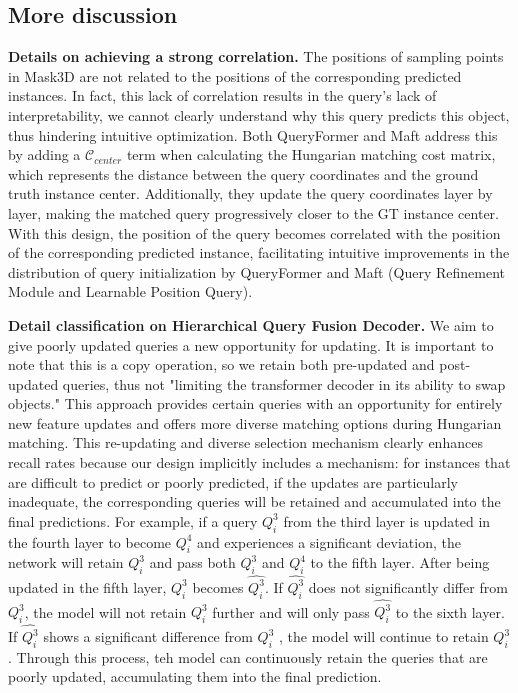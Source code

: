 \subsection{More discussion}
\label{Morediscussion}
\textbf{Details on achieving a strong correlation.} The positions of sampling points in Mask3D are not related to the positions of the corresponding predicted instances. In fact, this lack of correlation results in the query's lack of interpretability, we cannot clearly understand why this query predicts this object, thus hindering intuitive optimization. Both QueryFormer and Maft address this by adding a  $\mathcal{C}_{center}$
term when calculating the Hungarian matching cost matrix, which represents the distance between the query coordinates and the ground truth instance center. Additionally, they update the query coordinates layer by layer, making the matched query progressively closer to the GT instance center. With this design, the position of the query becomes correlated with the position of the corresponding predicted instance, facilitating intuitive improvements in the distribution of query initialization by QueryFormer and Maft (Query Refinement Module and Learnable Position Query).

\textbf{Detail classification on Hierarchical Query Fusion Decoder.} We aim to give poorly updated queries a new opportunity for updating. It is important to note that this is a copy operation, so we retain both pre-updated and post-updated queries, thus not "limiting the transformer decoder in its ability to swap objects." This approach provides certain queries with an opportunity for entirely new feature updates and offers more diverse matching options during Hungarian matching. This re-updating and diverse selection mechanism clearly enhances recall rates because our design implicitly includes a mechanism: for instances that are difficult to predict or poorly predicted, if the updates are particularly inadequate, the corresponding queries will be retained and accumulated into the final predictions. For example, if a query $ Q_{i}^3$ from the third layer is updated in the fourth layer to become $ Q_{i}^4$ and experiences a significant deviation, the network will retain $ Q_{i}^3$ and pass both $ Q_{i}^3$ and $ Q_{i}^4$ to the fifth layer. After being updated in the fifth layer, $ Q_{i}^3$ becomes $ \hat{Q_{i}^3}$. If $ \hat{Q_{i}^3}$ does not significantly differ from $ Q_{i}^3$, the model will not retain $ Q_{i}^3$ further and will only pass $ \hat{Q_{i}^3}$ to the sixth layer. If $ \hat{Q_{i}^3}$ shows a significant difference from $ Q_{i}^3$ , the model will continue to retain $ Q_{i}^3$. Through this process, teh model can continuously retain the queries that are poorly updated, accumulating them into the final prediction.

